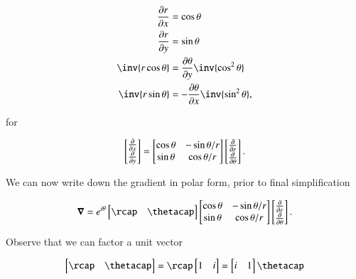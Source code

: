 \begin{align}\label{eqn:divGradCurLap:8}
\PD{x}{r} &= \cos\theta \\
\PD{y}{r} &= \sin\theta \\ 
\inv{r\cos\theta} &= \PD{y}{\theta} \inv{\cos^2\theta} \\
\inv{r\sin\theta} &= -\PD{x}{\theta} \inv{\sin^2\theta},
\end{align}

for

\begin{align}\label{eqn:divGradCurLap:6e}
\begin{bmatrix}
\frac{\partial {}}{\partial {x}} \\
\frac{\partial {}}{\partial {y}} 
\end{bmatrix}
= 
\begin{bmatrix}
\cos\theta & -\sin\theta/r \\
\sin\theta & \cos\theta/r
\end{bmatrix}
\begin{bmatrix}
\frac{\partial {}}{\partial {r}} \\
\frac{\partial {}}{\partial {\theta}} 
\end{bmatrix}.
\end{align}

We can now write down the gradient in polar form, prior to final simplification

\begin{align}\label{eqn:divGradCurLap:4a}
\spacegrad 
= 
e^{i\theta}
\begin{bmatrix}
\rcap & \thetacap
\end{bmatrix}
\begin{bmatrix}
\cos\theta & -\sin\theta/r \\
\sin\theta & \cos\theta/r
\end{bmatrix}
\begin{bmatrix}
\PD{r}{} \\
\PD{\theta}{} 
\end{bmatrix}.
\end{align}

Observe that we can factor a unit vector 

\begin{align}\label{eqn:divGradCurLap:9}
\begin{bmatrix}
\rcap & \thetacap
\end{bmatrix}
=
\rcap
\begin{bmatrix}
1 & i
\end{bmatrix}
=
\begin{bmatrix}
i & 1
\end{bmatrix}
\thetacap
\end{align}

